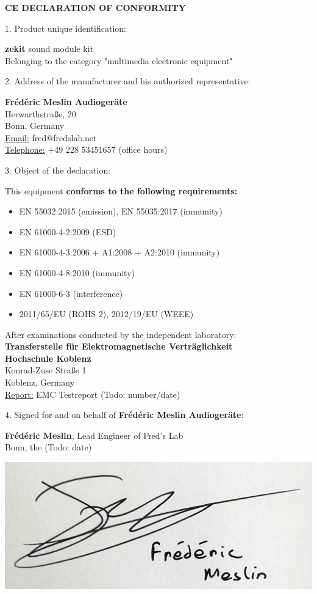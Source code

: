 \documentclass{scrartcl}
\begin{document}
\textbf{CE DECLARATION OF CONFORMITY}

1. Product unique identification:

\textbf{zekit} sound module kit \\
\indent Belonging to the category "multimedia electronic equipment"

2. Address of the manufacturer and his authorized representative:

\textbf{Frédéric Meslin Audiogeräte} \\
\indent Herwarthstraße, 20 \\
 Bonn, Germany \\
\indent \underline{Email:} fred@fredslab.net \\
\indent \underline{Telephone:} +49 228 53451657 (office hours)

3. Object of the declaration:

\indent This equipment \textbf{conforms to the following requirements:}

\begin{itemize}
    \item EN 55032:2015 (emission), EN 55035:2017 (immunity)
    \item EN 61000-4-2:2009 (ESD)
    \item EN 61000-4-3:2006 + A1:2008 + A2:2010 (immunity)
    \item EN 61000-4-8:2010 (immunity)
    \item EN 61000-6-3 (interference)
    \item 2011/65/EU (ROHS 2), 2012/19/EU (WEEE)
\end{itemize}

After examinations conducted by the independent laboratory: \\
\indent \textbf{Transferstelle für Elektromagnetische Verträglichkeit} \\
\indent \textbf{Hochschule Koblenz} \\
\indent Konrad-Zuse Straße 1 \\
 Koblenz, Germany \\
\indent \underline{Report:} EMC Testreport (Todo: number/date)

4. Signed for and on behalf of \textbf{Frédéric Meslin Audiogeräte}:

\indent \textbf{Frédéric Meslin}, Lead Engineer of Fred's Lab \\
\indent Bonn, the (Todo: date)

\vspace*{0.25cm}
\indent \includegraphics[scale=0.15]{assets/signature.jpg}
\end{document}
